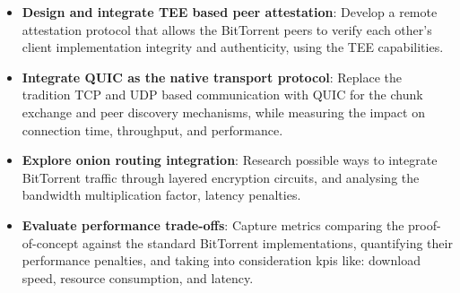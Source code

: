   \begin{itemize}
    \item \textbf{Design and integrate TEE based peer attestation}: Develop a remote attestation protocol that allows the BitTorrent peers to verify each other's client implementation integrity and authenticity, using the TEE capabilities.

    \item \textbf{Integrate QUIC as the native transport protocol}: Replace the tradition TCP and UDP based communication with QUIC for the chunk exchange and peer discovery mechanisms, while measuring the impact on connection time, throughput, and performance.

    \item \textbf{Explore onion routing integration}: Research possible ways to integrate BitTorrent traffic through layered encryption circuits, and analysing the bandwidth multiplication factor, latency penalties.

    \item \textbf{Evaluate performance trade-offs}: Capture metrics comparing the proof-of-concept against the standard BitTorrent implementations, quantifying their performance penalties, and taking into consideration kpis like: download speed, resource consumption, and latency.
  \end{itemize}
